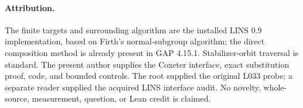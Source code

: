 \documentclass[11pt]{article}
\begin{document}
\paragraph{Attribution.}
The finite targets and surrounding algorithm are the installed LINS 0.9
implementation, based on Firth's normal-subgroup algorithm; the direct
composition method is already present in GAP 4.15.1. Stabilizer-orbit
traversal is standard. The present author supplies the Coxeter interface,
exact substitution proof, code, and bounded controls. The root supplied
the original L033 probe; a separate reader supplied the acquired LINS
interface audit. No novelty, whole-source, measurement, question, or Lean
credit is claimed.
\end{document}
